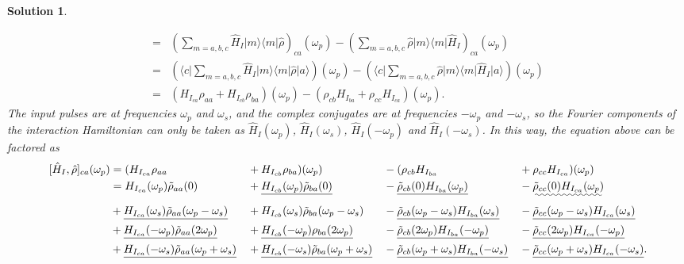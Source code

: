\documentclass[UTF8,10pt,a4paper]{article}
\theoremstyle{Problem}
\theoremstyle{Solution}
\newtheorem*{sol}{Solution}
\begin{document}
\begin{sol}
\begin{enumerate}
\begin{align}
            \nonumber=&\left(\sum_{m=a,b,c}\hat{H}_I\lvert m\rangle\langle m\rvert\hat{\rho}\right)_{ca}(\omega_p)-\left(\sum_{m=a,b,c}\hat{\rho}\lvert m\rangle\langle m\rvert\hat{H}_I\right)_{ca}(\omega_p)\\
            \nonumber=&\left(\langle c\rvert\sum_{m=a,b,c}\hat{H}_I\lvert m\rangle\langle m\rvert\hat{\rho}\lvert a\rangle\right)(\omega_p)-\left(\langle c\rvert\sum_{m=a,b,c}\hat{\rho}\lvert m\rangle\langle m\rvert\hat{H}_I\lvert a\rangle\right)(\omega_p)\\
            =&\left(H_{I_{ca}}\rho_{aa}+H_{I_{cb}}\rho_{ba}\right)(\omega_p)-\left(\rho_{cb}H_{I_{ba}}+\rho_{cc}H_{I_{ca}}\right)(\omega_p).
        \end{align}
        The input pulses are at frequencies $\omega_p$ and $\omega_s$, and the complex conjugates are at frequencies $-\omega_p$ and $-\omega_s$, so the Fourier components of the interaction Hamiltonian can only be taken as $\hat{H}_I(\omega_p)$, $\hat{H}_I(\omega_s)$, $\hat{H}_I(-\omega_p)$ and $\hat{H}_I(-\omega_s)$. In this way, the equation above can be factored as
        \small
        \begin{align}
            \nonumber[\hat{H}_I,\hat{\rho}]_{ca}(\omega_p)&=(H_{I_{ca}}\rho_{aa}&&+H_{I_{cb}}\rho_{ba})(\omega_p)&&-(\rho_{cb}H_{I_{ba}}&&+\rho_{cc}H_{I_{ca}})(\omega_p)\\
            \nonumber&=H_{I_{ca}}(\omega_p)\tilde{\rho}_{aa}(0)&&+\uline{H_{I_{cb}}(\omega_p)\tilde{\rho}_{ba}(0)}&&-\uline{\tilde{\rho}_{cb}(0)H_{I_{ba}}(\omega_p)}&&-\uwave{\tilde{\rho}_{cc}(0)H_{I_{ca}}(\omega_p)}\\
            \nonumber&+\uline{H_{I_{ca}}(\omega_s)\tilde{\rho}_{aa}(\omega_p-\omega_s)}&&+H_{I_{cb}}(\omega_s)\tilde{\rho}_{ba}(\omega_p-\omega_s)&&-\uline{\tilde{\rho}_{cb}(\omega_p-\omega_s)H_{I_{ba}}(\omega_s)}&&-\uline{\tilde{\rho}_{cc}(\omega_p-\omega_s)H_{I_{ca}}(\omega_s)}\\
            \nonumber&+\uline{H_{I_{ca}}(-\omega_p)\tilde{\rho}_{aa}(2\omega_p)}&&+\uline{H_{I_{cb}}(-\omega_p)\rho_{ba}(2\omega_p)}&&-\uline{\tilde{\rho}_{cb}(2\omega_p)H_{I_{ba}}(-\omega_p)}&&-\uline{\tilde{\rho}_{cc}(2\omega_p)H_{I_{ca}}(-\omega_p)}\\
            &+\uline{H_{I_{ca}}(-\omega_s)\tilde{\rho}_{aa}(\omega_p+\omega_s)}&&+\uline{H_{I_{cb}}(-\omega_s)\tilde{\rho}_{ba}(\omega_p+\omega_s)}&&-\uline{\tilde{\rho}_{cb}(\omega_p+\omega_s)H_{I_{ba}}(-\omega_s)}&&-\uline{\tilde{\rho}_{cc}(\omega_p+\omega_s)H_{I_{ca}}(-\omega_s)}.
        \end{align}

\end{enumerate}
\end{sol}
\end{document}
